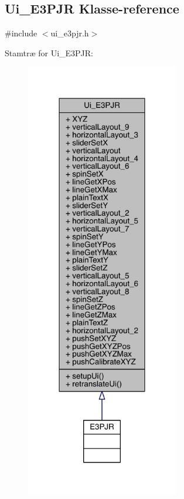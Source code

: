 \hypertarget{class_ui___e3_p_j_r}{}\subsection{Ui\+\_\+\+E3\+P\+JR Klasse-\/reference}
\label{class_ui___e3_p_j_r}


{\ttfamily \#include $<$ui\+\_\+e3pjr.\+h$>$}



Stamtræ for Ui\+\_\+\+E3\+P\+JR\+:
\nopagebreak
\begin{figure}[H]
\begin{center}
\leavevmode
\includegraphics[width=189pt]{class_ui___e3_p_j_r__inherit__graph}
\end{center}
\end{figure}



